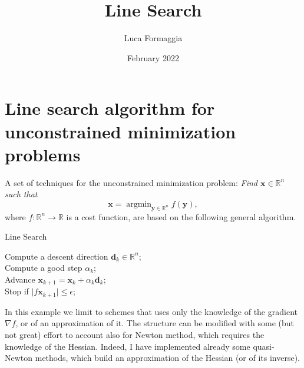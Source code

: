 \documentclass{article}
\author{Luca Formaggia}
\title{Line Search}
\date{February 2022}
\begin{document}
\maketitle
\section{Line search algorithm for unconstrained minimization problems}
A set of techniques for the unconstrained minimization problem: \emph{Find $\mathbf{x}\in \mathbb{R}^n$
such that}
\[
\mathbf{x}=\operatorname{argmin}_{\mathbf{y}\in\mathbb{R}^n} f(\mathbf{y}),
\]
where $f:\mathbb{R}^n\to\mathbb{R}$ is a cost function, are based on the following general algorithm.
\begin{algorithm}
    \caption{Line Search}
Compute a descent direction $\mathbf{d}_k\in\mathbb{R}^n$;\\
Compute a good step $\alpha_k$;\\
Advance $\mathbf{x}_{k+1}=\mathbf{x}_k+\alpha_k\mathbf{d}_k$;\\
Stop if $\vert f\mathbf{x}_{k+1}\vert\le\epsilon$;\\
\end{algorithm}

In this example we limit to schemes that uses only the knowledge of the gradient $\nabla f$, or of an approximation of it. The structure can be modified with some (but not great) effort to account also for Newton method, which requires the knowledge of the Hessian.
Indeed, I have implemented already some quasi-Newton methods, which build an approximation of the Hessian (or of its inverse).
\end{document}
